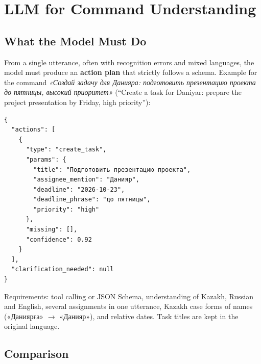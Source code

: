 \documentclass[11pt,a4paper]{article}
\begin{document}
\section{LLM for Command Understanding}\label{sec:llm}

\subsection{What the Model Must Do}

From a single utterance, often with recognition errors and mixed languages, the model must produce an \textbf{action plan} that strictly follows a schema. Example for the command \textit{«Создай задачу для Данияра: подготовить презентацию проекта до пятницы, высокий приоритет»} (“Create a task for Daniyar: prepare the project presentation by Friday, high priority”):

\begin{Verbatim}[fontsize=\small,frame=single,framesep=6pt,rulecolor=\color{gray!50}]
{
  "actions": [
    {
      "type": "create_task",
      "params": {
        "title": "Подготовить презентацию проекта",
        "assignee_mention": "Данияр",
        "deadline": "2026-10-23",
        "deadline_phrase": "до пятницы",
        "priority": "high"
      },
      "missing": [],
      "confidence": 0.92
    }
  ],
  "clarification_needed": null
}
\end{Verbatim}

Requirements: tool calling or JSON Schema, understanding of Kazakh, Russian and English, several assignments in one utterance, Kazakh case forms of names («Даниярға» $\rightarrow$ «Данияр»), and relative dates. Task titles are kept in the original language.

\subsection{Comparison}
\end{document}
